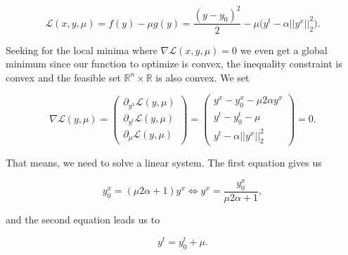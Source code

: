                 \begin{equation}
                    \mathcal{L}(x, y, \mu) = f(y) - \mu g(y) = \frac{(y - y_{0})^{2}}{2} - \mu \bigg( y^{t} - \alpha||y^{x}||_{2}^{2} \bigg).
                \end{equation}

                Seeking for the local minima where $\nabla \mathcal{L}(x, y, \mu) = 0$ we even get a global minimum since our function to optimize is convex, the inequality constraint is convex and the feasible set $\mathbb{R}^{n} \times \mathbb{R}$ is also convex. We set

                \begin{equation}
                    \nabla \mathcal{L}(y, \mu) =
                    \begin{pmatrix}
                        \partial_{y^{x}} \mathcal{L}(y, \mu) \\
                        \partial_{y^{t}} \mathcal{L}(y, \mu) \\
                        \partial_{\mu} \mathcal{L}(y, \mu)
                    \end{pmatrix} = 
                    \begin{pmatrix}
                        y^{x} - y_{0}^{x} - \mu 2 \alpha y^{x} \\
                        y^{t} - y_{0}^{t} - \mu \\
                        y^{t} - \alpha||y^{x}||_{2}^{2}
                    \end{pmatrix}
                    = 0. \label{eq:linearSystem}
                \end{equation}

                That means, we need to solve a linear system. The first equation gives us

                \begin{equation}
                    y_{0}^{x} = (\mu 2 \alpha + 1) y^{x} \Longleftrightarrow y^{x} = \frac{y_{0}^{x}}{\mu 2 \alpha + 1}, \label{eq:1stequ}
                \end{equation}

                and the second equation leads us to

                \begin{equation}
                    y^{t} = y_{0}^{t} + \mu. \label{eq:2ndequ}
                \end{equation}


